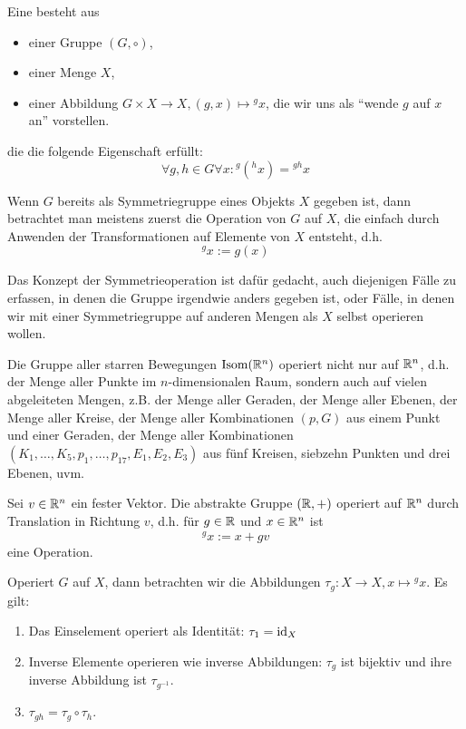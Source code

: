 \begin{definition}
Eine  besteht aus
\begin{itemize}
\item einer Gruppe $(G,\circ)$,
\item einer Menge $X$,
\item einer Abbildung $G\times X\to X, (g,x)\mapsto{^g x}$, die wir uns als \enquote{wende $g$ auf $x$ an} vorstellen.
\end{itemize}
die die folgende Eigenschaft erfüllt:
\[\forall g,h\in G \forall x: {^g(^h x)} = {^{gh}x}\]
\end{definition}

\begin{example}
Wenn $G$ bereits als Symmetriegruppe eines Objekts $X$ gegeben ist, dann betrachtet man meistens zuerst die Operation von $G$ auf $X$, die einfach durch Anwenden der Transformationen auf Elemente von $X$ entsteht, d.h.
\[{^g x} := g(x)\]

Das Konzept der Symmetrieoperation ist dafür gedacht, auch diejenigen Fälle zu erfassen, in denen die Gruppe irgendwie anders gegeben ist, oder Fälle, in denen wir mit einer Symmetriegruppe auf anderen Mengen als $X$ selbst operieren wollen.
\end{example}

\begin{example}
Die Gruppe aller starren Bewegungen $\operatorname{Isom}(\mathbb{R}^n)$ operiert nicht nur auf $\mathbb{R}^n$, d.h. der Menge aller Punkte im $n$-dimensionalen Raum, sondern auch auf vielen abgeleiteten Mengen, z.B. der Menge aller Geraden, der Menge aller Ebenen, der Menge aller Kreise, der Menge aller Kombinationen $(p,G)$ aus einem Punkt und einer Geraden, der Menge aller Kombinationen $(K_1,\ldots,K_5, p_1,\ldots,p_{17}, E_1,E_2,E_3)$ aus fünf Kreisen, siebzehn Punkten und drei Ebenen, uvm.
\end{example}

\begin{example}
Sei $v\in\mathbb{R}^n$ ein fester Vektor. Die abstrakte Gruppe $(\mathbb{R},+)$ operiert auf $\mathbb{R}^n$ durch Translation in Richtung $v$, d.h. für $g\in\mathbb{R}$ und $x\in\mathbb{R}^n$ ist
\[{^g x} := x+gv\]
eine Operation.
\end{example}

\begin{lemma}[Offensichtliches]
Operiert $G$ auf $X$, dann betrachten wir die Abbildungen $\tau_g: X\to X, x\mapsto {^g x}$. Es gilt:
\begin{enumerate}
\item Das Einselement operiert als Identität: $\tau_1=\operatorname{id}_X$
\item Inverse Elemente operieren wie inverse Abbildungen: $\tau_g$ ist bijektiv und ihre inverse Abbildung ist $\tau_{g^{-1}}$.
\item $\tau_{gh} =\tau_g\circ\tau_h$.
\end{enumerate}
\end{lemma}

